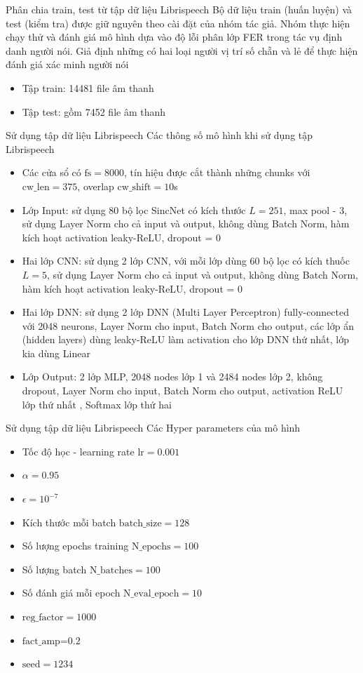 \documentclass[notheorems, aspectratio=54]{beamer}
\begin{document}
\begin{frame}{Phân chia train, test từ tập dữ liệu Librispeech}
	Bộ dữ liệu train (huấn luyện) và test (kiểm tra) được giữ nguyên theo cài đặt của nhóm tác giả. Nhóm thực hiện chạy thử và đánh giá mô hình dựa vào độ lỗi phân lớp FER trong tác vụ định danh người nói. Giả định những có hai loại người vị trí số chẵn và lẻ để thực hiện đánh giá xác minh người nói
	\begin{itemize}
		\item Tập train: 14481 file âm thanh
		\item Tập test: gồm 7452 file âm thanh
	\end{itemize}
\end{frame}
\begin{frame}{Sử dụng tập dữ liệu Librispeech}
	Các thông số mô hình khi sử dụng tập Librispeech
	\begin{itemize}
		\item Các cửa sổ có $\text{fs} = 8000$, tín hiệu được cắt thành những chunks với $\text{cw\_len}=375$, overlap $\text{cw\_shift}=10$s
		\item Lớp Input: sử dụng 80 bộ lọc SincNet có kích thước $L=251$, max pool - 3, sử dụng Layer Norm cho cả input và output, không dùng Batch Norm, hàm kích hoạt activation leaky-ReLU, dropout = 0
		\item Hai lớp CNN: sử dụng 2 lớp CNN, với mỗi lớp dùng 60 bộ lọc có kích thuốc $L=5$, sử dụng Layer Norm cho cả input và output, không dùng Batch Norm, hàm kích hoạt activation leaky-ReLU, dropout = 0
		\item Hai lớp DNN: sử dụng 2 lớp DNN (Multi Layer Perceptron) fully-connected với 2048 neurons, Layer Norm cho input, Batch Norm cho output, các lớp ẩn (hidden layers) dùng leaky-ReLU làm activation cho lớp DNN thứ nhất, lớp kia dùng Linear
		\item Lớp Output: 2 lớp MLP, 2048 nodes lớp 1 và 2484 nodes lớp 2, không dropout, Layer Norm cho input, Batch Norm cho output, activation ReLU lớp thứ nhất , Softmax lớp thứ hai 
	\end{itemize}
\end{frame}
\begin{frame}{Sử dụng tập dữ liệu Librispeech}
		Các Hyper parameters của mô hình
		\begin{itemize}
			\item Tốc độ học - learning rate $\text{lr} = 0.001$
			\item $\alpha = 0.95$
			\item $\epsilon = 10^{-7}$
			\item Kích thước mỗi batch $\text{batch\_size}=128$
			\item Số lượng epochs training $\text{N\_epochs}=100$
			\item Số lượng batch $\text{N\_batches}=100$
			\item Số đánh giá mỗi epoch $\text{N\_eval\_epoch}=10$
			\item $\text{reg\_factor}=1000$
			\item $\text{fact\_amp=0.2}$
			\item $\text{seed}=1234$
		\end{itemize}
\end{frame}
\end{document}

